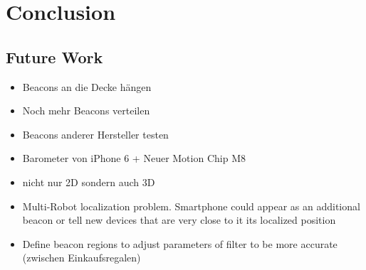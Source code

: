 \chapter{Conclusion} \label{chap:conclusion}
\section{Future Work} \label{sec:future}

\begin{itemize}
	\item Beacons an die Decke hängen
	\item Noch mehr Beacons verteilen
	\item Beacons anderer Hersteller testen
	\item Barometer von iPhone 6 + Neuer Motion Chip M8
	\item nicht nur 2D sondern auch 3D
	\item Multi-Robot localization problem. Smartphone could appear as an additional beacon or tell new devices that are very close to it its localized position
	\item Define beacon regions to adjust parameters of filter to be more accurate (zwischen Einkaufsregalen)
\end{itemize}
